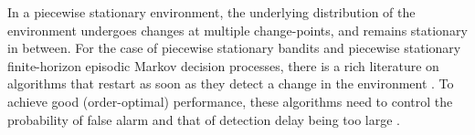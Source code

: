 \documentclass[12pt]{interact}
\theoremstyle{plain}
\newcommand{\yhh}[1]{{\color{purple}{#1}}}
\begin{document}
In a piecewise stationary environment, the underlying distribution of the environment undergoes changes at multiple change-points, and remains stationary in between. For the case of piecewise stationary bandits and piecewise stationary finite-horizon episodic Markov decision processes, there is a rich literature on algorithms that restart as soon as they detect a change in the environment \citep{auer2019adswitch, wei2021master, besson2022efficient, yadkori2023nsb, gerogiannis2024blackboxfeas, huang2025change}. To achieve good (order-optimal) performance, these algorithms need to control the probability of false alarm and that of detection delay being too large \citep{besson2022efficient, huang2025change}. 
\end{document}
